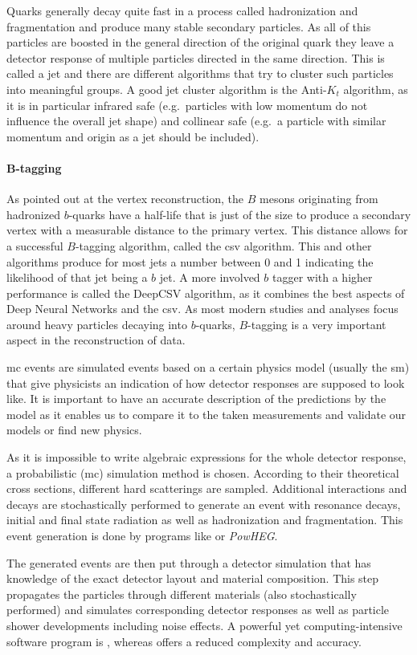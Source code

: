 Quarks generally decay quite fast in a process called hadronization and fragmentation and produce many stable secondary particles. As all of this particles are boosted in the general direction of the original quark they leave a detector response of multiple particles directed in the same direction. This is called a jet and there are different algorithms that try to cluster such particles into meaningful groups. A good jet cluster algorithm is the Anti-\(K_t\) algorithm, as it is in particular infrared safe (e.g.\ particles with low momentum do not influence the overall jet shape) and collinear safe (e.g.\ a particle with similar momentum and origin as a jet should be included).~\cite{like-bf46}

\paragraph{B-tagging}

As pointed out at the vertex reconstruction, the \(B\) mesons originating from hadronized \(b\)-quarks have a half-life that is just of the size to produce a secondary vertex with a measurable distance to the primary vertex. This distance allows for a successful \(B\)-tagging algorithm, called the \gls{csv} algorithm. This and other algorithms produce for most jets a number between 0 and 1 indicating the likelihood of that jet being a \(b\) jet. A more involved \(b\) tagger with a higher performance is called the DeepCSV algorithm, as it combines the best aspects of Deep Neural Networks and the \gls{csv}. As most modern studies and analyses focus around heavy particles decaying into \(b\)-quarks, \(B\)-tagging is a very important aspect in the reconstruction of data.~\cite{like-bf48}

\label{sssec:mc}

\gls{mc} events are simulated events based on a certain physics model (usually the \gls{sm}) that give physicists an indication of how detector responses are supposed to look like. It is important to have an accurate description of the predictions by the model as it enables us to compare it to the taken measurements and validate our models or find new physics.

As it is impossible to write algebraic expressions for the whole detector response, a probabilistic (\gls{mc}) simulation method is chosen. According to their theoretical cross sections, different hard scatterings are sampled. Additional interactions and decays are stochastically performed to generate an event with resonance decays, initial and final state radiation as well as hadronization and fragmentation. This event generation is done by programs like \pythia{} or \textit{PowHEG}.

The generated events are then put through a detector simulation that has knowledge of the exact detector layout and material composition. This step propagates the particles through different materials (also stochastically performed) and simulates corresponding detector responses as well as particle shower developments including noise effects. A powerful yet computing-intensive software program is \geant{}, whereas \delphes{} offers a reduced complexity and accuracy.~\cite{cms-eventgen,cms-fastsim}
